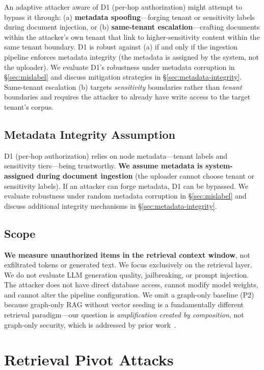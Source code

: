\documentclass[letterpaper,twocolumn,10pt]{article}
\begin{document}
An adaptive attacker aware of D1 (per-hop authorization) might
attempt to bypass it through: (a) \textbf{metadata spoofing}---forging
tenant or sensitivity labels during document injection, or
(b) \textbf{same-tenant escalation}---crafting documents within the
attacker's own tenant that link to higher-sensitivity content within
the same tenant boundary. D1 is robust against (a) if and only if the
ingestion pipeline enforces metadata integrity (the metadata
is assigned by the system, not the uploader). We evaluate D1's
robustness under metadata corruption in \S\ref{sec:mislabel} and
discuss mitigation strategies in \S\ref{sec:metadata-integrity}.
Same-tenant escalation (b) targets \emph{sensitivity} boundaries
rather than \emph{tenant} boundaries and requires the attacker to
already have write access to the target tenant's corpus.

\subsection{Metadata Integrity Assumption}

D1 (per-hop authorization) relies on node metadata---tenant labels and
sensitivity tiers---being trustworthy. \textbf{We assume metadata is
system-assigned during document ingestion} (the uploader cannot choose
tenant or sensitivity labels). If an attacker can forge metadata, D1
can be bypassed. We evaluate robustness under random metadata
corruption in \S\ref{sec:mislabel} and discuss additional integrity
mechanisms in \S\ref{sec:metadata-integrity}.

\subsection{Scope}

\textbf{We measure unauthorized items in the retrieval context
window}, not exfiltrated tokens or generated text. We focus exclusively
on the retrieval layer. We do not evaluate LLM generation quality,
jailbreaking, or prompt injection. The attacker does not have direct
database access, cannot modify model weights, and cannot alter the
pipeline configuration. We omit a graph-only baseline (P2) because
graph-only RAG without vector seeding is a fundamentally different
retrieval paradigm---our question is \emph{amplification created by
composition}, not graph-only security, which is addressed by prior
work~\cite{gragpoison2026, fewwords2025}.

\section{Retrieval Pivot Attacks}
\label{sec:attacks}
\end{document}
